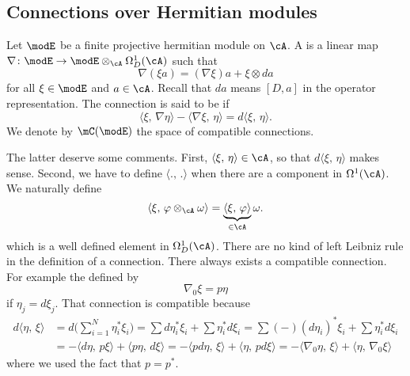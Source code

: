 \subsection{Connections over Hermitian modules}

\begin{definition}
	Let $\modE$ be a finite projective hermitian module on $\cA$. A  is a linear map $\nabla\colon \modE\to \modE\otimes_{\cA}\Omega^1_D(\cA)$ such that
	\begin{equation}
		\nabla(\xi a)=(\nabla\xi)a+\xi\otimes da
	\end{equation}
	for all $\xi\in\modE$ and $a\in\cA$. Recall that $da$ means $[D,a]$ in the operator representation. The connection is said to be  if
	\begin{equation}
		\langle \xi,\,\nabla\eta\rangle-\langle \nabla\xi,\,\eta\rangle=d\langle \xi,\,\eta\rangle.
	\end{equation}
	We denote by $\mC(\modE)$ the space of compatible connections.

\end{definition}
The latter deserve some comments. First, $\langle \xi,\,\eta\rangle\in\cA$, so that $d\langle \xi,\,\eta\rangle$ makes sense. Second, we have to define $\langle .,\,.\rangle$ when there are a component in $\Omega^1(\cA)$. We naturally define
\[
	\langle \xi,\,\varphi\otimes_{\cA}\omega\rangle=\underbrace{\langle \xi,\, \varphi\rangle}_{\in\cA}\omega.
\]
which is a well defined element in $\Omega^1_D(\cA)$. There are no kind of left Leibniz rule in the definition of a connection. There always exists a compatible connection. For example the  defined by
\begin{equation}
	\nabla_0\xi=p\eta
\end{equation}
if $\eta_j=d\xi_j$. That connection is compatible because
\begin{equation}
	\begin{split}
		d\langle \eta,\,\xi\rangle&=d\big( \sum_{i=1}^{N}\eta_i^*\xi_i \big)=\sum d\eta_i^*\xi_i+\sum \eta_i^*d\xi_i
		=\sum (-)(d\eta_i)^*\xi_i+\sum \eta_i^*d\xi_i\\
		&=-\langle d\eta,\,p\xi\rangle+\langle p\eta,\,d\xi\rangle=-\langle pd\eta,\,\xi\rangle+\langle  \eta,\,pd\xi\rangle
		=-\langle \nabla_0\eta,\,\xi\rangle+\langle \eta,\,\nabla_0\xi\rangle
	\end{split}
\end{equation}
where we used the fact that $p=p^*$.


